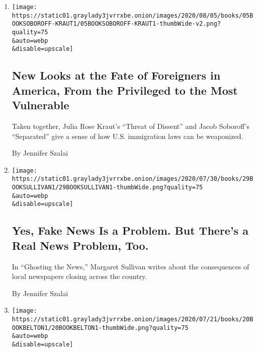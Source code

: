 \begin{enumerate}
\def\labelenumi{\arabic{enumi}.}
\item
  \href{/2020/07/30/books/review-threat-dissent-julia-rose-kraut-separated-jacob-soboroff.html}{}

  \texttt{[image: https://static01.graylady3jvrrxbe.onion/images/2020/08/05/books/05BOOKSOBOROFF-KRAUT1/05BOOKSOBOROFF-KRAUT1-thumbWide-v2.png?quality=75\\\&auto=webp\\\&disable=upscale]}

  \hypertarget{new-looks-at-the-fate-of-foreigners-in-america-from-the-privileged-to-the-most-vulnerable}{%
  \subsection{New Looks at the Fate of Foreigners in America, From the
  Privileged to the Most
  Vulnerable}\label{new-looks-at-the-fate-of-foreigners-in-america-from-the-privileged-to-the-most-vulnerable}}

  Taken together, Julia Rose Kraut's ``Threat of Dissent'' and Jacob
  Soboroff's ``Separated'' give a sense of how U.S. immigration laws can
  be weaponized.

  By Jennifer Szalai
\item
  \href{/2020/07/26/books/review-ghosting-news-local-journalism-democracy-crisis-margaret-sullivan.html}{}

  \texttt{[image: https://static01.graylady3jvrrxbe.onion/images/2020/07/30/books/29BOOKSULLIVAN1/29BOOKSULLIVAN1-thumbWide.png?quality=75\\\&auto=webp\\\&disable=upscale]}

  \hypertarget{yes-fake-news-is-a-problem-but-theres-a-real-news-problem-too}{%
  \subsection{Yes, Fake News Is a Problem. But There's a Real News
  Problem,
  Too.}\label{yes-fake-news-is-a-problem-but-theres-a-real-news-problem-too}}

  In ``Ghosting the News,'' Margaret Sullivan writes about the
  consequences of local newspapers closing across the country.

  By Jennifer Szalai
\item
  \href{/2020/07/16/books/review-putins-people-kgb-catherine-belton.html}{}

  \texttt{[image: https://static01.graylady3jvrrxbe.onion/images/2020/07/21/books/20BOOKBELTON1/20BOOKBELTON1-thumbWide.png?quality=75\\\&auto=webp\\\&disable=upscale]}


\end{enumerate}
